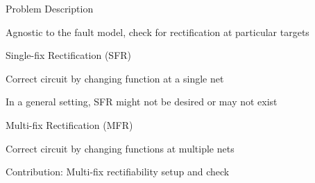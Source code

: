 \begin{frame}{\large Problem Description}
\bi 
	\item Agnostic to the fault model, check for rectification at particular targets
	\bi
		\item Single-fix Rectification (SFR)
		\bi
			\item Correct circuit by changing function at a single net
		\ei
	\ei
	\vspace{0.1in}
	\vspace{0.1in}
	\vspace{0.1in}
	\item In a general setting, SFR might not be desired or may not exist
	\bi
	\item Multi-fix Rectification (MFR)
	\bi
		\item Correct circuit by changing functions at multiple nets
		\item Contribution: Multi-fix rectifiability setup and check
	\ei
	\ei
\ei
\end{frame}




